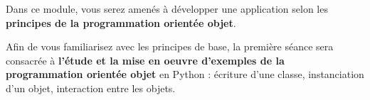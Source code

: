 
Dans ce module, vous serez amenés à développer une application selon les \textbf{principes de la programmation orientée objet}.

Afin de vous familiarisez avec les principes de base, la première séance sera consacrée à \textbf{l'étude et la mise en oeuvre d'exemples de la programmation orientée objet} en Python : écriture d'une classe, instanciation d'un objet, interaction entre les objets.



